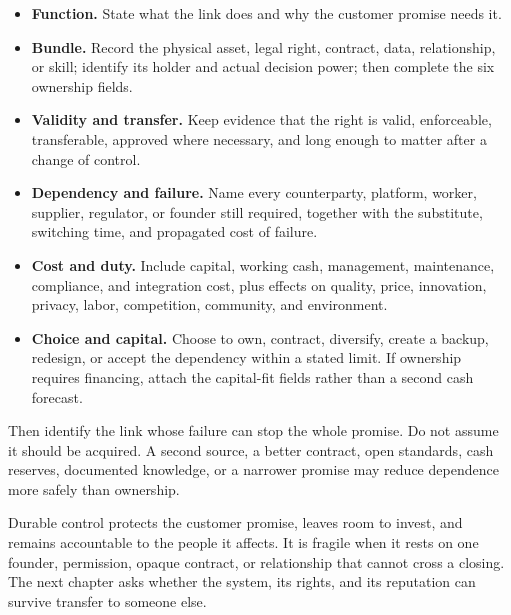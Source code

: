 \begin{itemize}[leftmargin=0pt,label={},labelsep=0pt,itemsep=0.15em,
  parsep=0pt,topsep=0.3em]
\item \textbf{Function.} State what the link does and why the customer promise
  needs it.
\item \textbf{Bundle.} Record the physical asset, legal right, contract, data,
  relationship, or skill; identify its holder and actual decision power; then
  complete the six ownership fields.
\item \textbf{Validity and transfer.} Keep evidence that the right is valid,
  enforceable, transferable, approved where necessary, and long enough to
  matter after a change of control.
\item \textbf{Dependency and failure.} Name every counterparty, platform,
  worker, supplier, regulator, or founder still required, together with the
  substitute, switching time, and propagated cost of failure.
\item \textbf{Cost and duty.} Include capital, working cash, management,
  maintenance, compliance, and integration cost, plus effects on quality,
  price, innovation, privacy, labor, competition, community, and environment.
\item \textbf{Choice and capital.} Choose to own, contract, diversify, create a
  backup, redesign, or accept the dependency within a stated limit. If
  ownership requires financing, attach the capital-fit fields rather than a
  second cash forecast.
\end{itemize}

Then identify the link whose failure can stop the whole promise. Do not assume
it should be acquired. A second source, a better contract, open standards, cash
reserves, documented knowledge, or a narrower promise may reduce dependence
more safely than ownership.

Durable control protects the customer promise, leaves room to invest, and
remains accountable to the people it affects. It is fragile when it rests on
one founder, permission, opaque contract, or relationship that cannot cross a
closing. The next chapter asks whether the system, its rights, and its
reputation can survive transfer to someone else.
